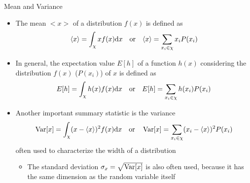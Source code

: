   \begin{frame}{Mean and Variance}
    \begin{itemize}
      \item The mean $<x>$ of a distribution $f(x)$ is defined as
        \begin{equation*}
          \langle x\rangle = \int_\chi xf(x) \mathrm{d}x
          \quad\text{or}\quad
          \langle x\rangle = \sum_{x_i\in\chi} x_iP(x_i)
        \end{equation*}
      \item In general, the expectation value $E[h]$ of a function $h(x)$ considering the distribution $f(x)$ ($P(x_i)$) of $x$ is defined as
        \begin{equation*}
          E[h] = \int_\chi h(x)f(x) \mathrm{d}x
          \quad\text{or}\quad
          E[h] = \sum_{x_i\in\chi} h(x_i)P(x_i)
        \end{equation*}
      \item Another important summary statistic is the variance
        \begin{equation*}
          \operatorname{Var}[x] = \int_\chi (x-\langle x\rangle)^2 f(x) \mathrm{d}x
          \quad\text{or}\quad
          \operatorname{Var}[x] = \sum_{x_i\in\chi} (x_i - \langle x\rangle)^2 P(x_i)
        \end{equation*}
        often used to characterize the width of a distribution
        \begin{itemize}
          \item The standard deviation $\sigma_x = \sqrt{\operatorname{Var}[x]}$ is also often used, because it has the same dimension as the random variable itself
        \end{itemize}
    \end{itemize}
  \end{frame}

